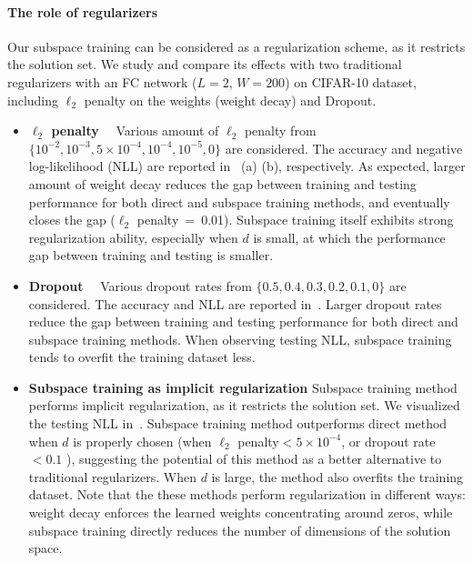 \documentclass{article} %
\begin{document}
\paragraph{The role of regularizers} Our subspace training can be considered as a regularization scheme, as it restricts the solution set. We study and compare its effects with two traditional regularizers with an FC network ($L\!\!=\!\!2$, $W\!\!=\!\!200$) on CIFAR-10 dataset, including $\ell_2$ penalty on the weights (\ie weight decay) and Dropout.

	\begin{itemize}
		\vspace{1mm}
		\item {\bf $\ell_2$  penalty}~~
		Various amount of $\ell_2$  penalty from $\{10^{-2}, 10^{-3}, 5 \!\times\! 10^{-4}, 10^{-4}, 10^{-5}, 0\}$ are considered. The accuracy and negative log-likelihood (NLL) are reported in~ (a) (b), respectively. As expected, larger amount of weight decay reduces the gap between training and testing performance for both direct and subspace training methods, and eventually closes the gap (\ie $\ell_2$ penalty~=~0.01). Subspace training itself exhibits strong regularization ability, especially when $d$ is small, at which the performance gap between training and testing is smaller. 
		\item  {\bf Dropout}~~
		Various dropout rates from $\{0.5, 0.4, 0.3, 0.2, 0.1, 0\}$ are considered. The accuracy and NLL are reported in~.  Larger dropout rates reduce the gap between training and testing performance for both direct and subspace training methods. 
		When observing testing NLL, subspace training tends to overfit the training dataset less.		
		\item  {\bf Subspace training as implicit regularization} Subspace training method performs implicit regularization, as it restricts the solution set. We visualized the testing NLL in~.
		 Subspace training method outperforms direct method when $d$ is properly chosen (when $\ell_2$ penalty$<5 \!\times\! 10^{-4}$, or dropout rate $<0.1$ ), suggesting the potential of this method as a better alternative to traditional regularizers. When $d$ is large, the method also overfits the training dataset. Note that the these methods perform regularization in different ways: weight decay enforces the learned weights concentrating around zeros, while subspace training directly reduces the number of dimensions of the solution space.
		
	\end{itemize}
\end{document}
